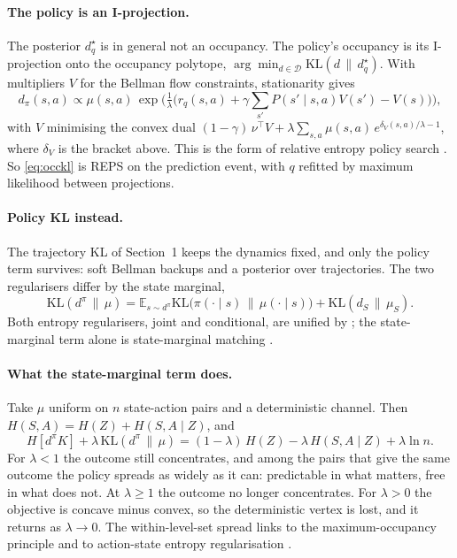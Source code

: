 \documentclass[10pt]{article}
\newcommand{\dpi}{d^\pi}
\newcommand{\E}{\mathbb E}
\newcommand{\Dcal}{\mathcal D}
\begin{document}
\paragraph{The policy is an I-projection.} The posterior $d^\star_q$ is in general not an occupancy. The policy's occupancy is its I-projection onto the occupancy polytope, $\arg\min_{d\in\Dcal}\mathrm{KL}(d\,\|\,d^\star_q)$. With multipliers $V$ for the Bellman flow constraints, stationarity gives
\begin{equation}
  d_\pi(s,a) \propto \mu(s,a)\, \exp\!\Big( \tfrac1\lambda \big( r_q(s,a) + \gamma \textstyle\sum_{s'} P(s'\mid s,a) V(s') - V(s) \big) \Big),
\end{equation}
with $V$ minimising the convex dual $(1-\gamma)\,\nu^\top V + \lambda \sum_{s,a} \mu(s,a)\, e^{\delta_V(s,a)/\lambda - 1}$, where $\delta_V$ is the bracket above. This is the form of relative entropy policy search \citep{Peters-relative10}. So \eqref{eq:occkl} is REPS on the prediction event, with $q$ refitted by maximum likelihood between projections.

\paragraph{Policy KL instead.} The trajectory KL of Section~1 keeps the dynamics fixed, and only the policy term survives: soft Bellman backups and a posterior over trajectories. The two regularisers differ by the state marginal,
\begin{equation}
  \mathrm{KL}(\dpi \,\|\, \mu) = \E_{s\sim \dpi} \mathrm{KL}\big(\pi(\cdot\mid s)\,\|\,\mu(\cdot\mid s)\big) + \mathrm{KL}(d_S \,\|\, \mu_S).
\end{equation}
Both entropy regularisers, joint and conditional, are unified by \citet{Neu-unified17}; the state-marginal term alone is state-marginal matching \citep{Lee-efficient19}.

\paragraph{What the state-marginal term does.} Take $\mu$ uniform on $n$ state-action pairs and a deterministic channel. Then $H(S,A) = H(Z) + H(S,A\mid Z)$, and
\begin{equation}
  H[\dpi K] + \lambda\,\mathrm{KL}(\dpi\,\|\,\mu) = (1-\lambda)\, H(Z) - \lambda\, H(S,A\mid Z) + \lambda \ln n .
\end{equation}
For $\lambda < 1$ the outcome still concentrates, and among the pairs that give the same outcome the policy spreads as widely as it can: predictable in what matters, free in what does not. At $\lambda \ge 1$ the outcome no longer concentrates. For $\lambda > 0$ the objective is concave minus convex, so the deterministic vertex is lost, and it returns as $\lambda \to 0$. The within-level-set spread links to the maximum-occupancy principle \citep{Ramirez-Ruiz-complex22} and to action-state entropy regularisation \citep{Grytskyy-general23}.
\end{document}
